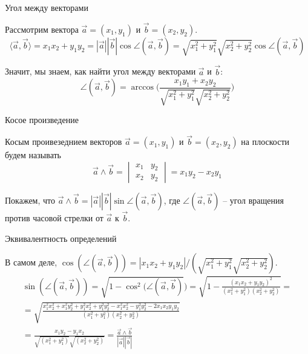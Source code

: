 \documentclass[12pt,aspectratio=169,svgnames]{beamer}
\begin{document}
\begin{frame}{Угол между векторами}

	Рассмотрим вектора $\vec{a} = (x_1, y_1)$ и $\vec{b} = (x_2, y_2)$.
	\[ \langle \vec{a}, \vec{b} \rangle = x_1 x_2 + y_1 y_2 = |\vec{a}||\vec{b}| \cos{\angle{(\vec{a}, \vec{b})}} = \sqrt{x_1^2 + y_1^2}\sqrt{x_2^2 + y_2^2} \cos{\angle(\vec{a}, \vec{b})}\]

	Значит, мы знаем, как найти угол между векторами $\vec{a}$ и $\vec{b}$:
	\[ \angle(\vec{a}, \vec{b}) = \arccos\bigg(\frac{x_1 y_1 + x_2 y_2}{\sqrt{x_1^2 + y_1^2} \sqrt{x_2^2 + y_2^2}}\bigg)\]

\end{frame}

\begin{frame}{Косое произведение}
	\begin{defn}
		\alert{Косым проивезеднием} векторов $\vec{a} = (x_1, y_1)$ и $\vec{b} = (x_2, y_2)$ на плоскости будем называть
		\[ \vec{a} \wedge \vec{b} =  \begin{vmatrix} x_1 & y_2 \\ x_2 & y_2  \end{vmatrix} = x_1 y_2 - x_2 y_1\]
	\end{defn}

	Покажем, что $\vec{a} \wedge \vec{b} = |\vec{a}| |\vec{b}| \sin{\angle(\vec{a}, \vec{b})}$, где $\angle(\vec{a}, \vec{b})$ -- угол
	вращения против часовой стрелки от $\vec{a}$ к $\vec{b}$.
\end{frame}

\begin{frame}{Эквивалентность определений}

	В самом деле, $\cos(\angle(\vec{a}, \vec{b})) = |x_1 x_2 + y_1 y_2| / (\sqrt{x_1^2 + y_1^2}\sqrt{x_2^2 + y_2^2})$.
	\begin{multline*} \sin(\angle(\vec{a},\vec{b})) = \sqrt{1 - \cos^2({\angle(\vec{a}, \vec{b})}}) = \sqrt{1 - \frac{(x_1 x_2 + y_1 y_2)^2}{(x_1^2 + y_1^2)(x_2^2 + y_2^2)}} =\\= \sqrt{\frac{x_1^2 x_2^2 + x_1^2 y_2^2 + y_1^2 x_2^2 + y_1^2 y_2^2 - x_1^2 x_2^2 - y_1^2 y_2^2 - 2 x_1 x_2 y_1 y_2 }{(x_1^2 + y_1^2)(x_2^2 + y_2^2)}} \\= \frac{x_1 y_2 - y_1 x_2}{\sqrt{(x_1^2 + y_1^2)}\sqrt{(x_2^2 + y_2^2)}} = \frac{\vec{a} \wedge \vec{b}}{|\vec{a}||\vec{b}|} \end{multline*}

\end{frame}
\end{document}
